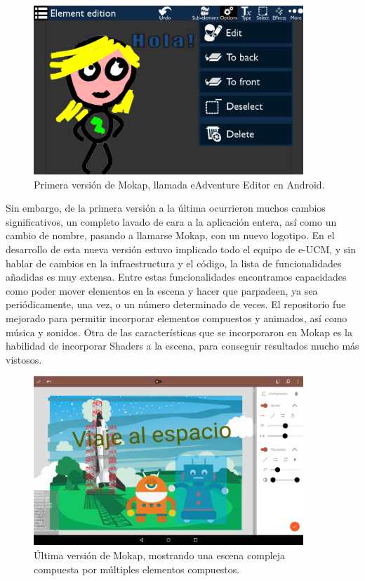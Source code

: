 \begin{figure}[htb]
	\includegraphics[height=2.5in]{figures/mokap1.png}
	\caption[Mokap - eAdventure Editor]{Primera versión de Mokap, llamada eAdventure Editor en Android.}
	\label{mokap1}
\end{figure}

Sin embargo, de la primera versión a la última ocurrieron muchos cambios significativos, un completo lavado de cara a la aplicación entera, así como un cambio de nombre, pasando a llamarse Mokap, con un nuevo logotipo. En el desarrollo de esta nueva versión estuvo implicado todo el equipo de e-UCM, y sin hablar de cambios en la infraestructura y el código, la lista de funcionalidades añadidas es muy extensa. Entre estas funcionalidades encontramos capacidades como poder mover elementos en la escena y hacer que parpadeen, ya sea periódicamente, una vez, o un número determinado de veces. El repositorio fue mejorado para permitir incorporar elementos compuestos y animados, así como música y sonidos. Otra de las características que se incorporaron en Mokap es la habilidad de incorporar Shaders a la escena, para conseguir resultados mucho más vistosos.

\begin{figure}[htb]
	\includegraphics[height=2.5in]{figures/mokap2.png}
	\caption[Mokap - Última Versión]{Última versión de Mokap, mostrando una escena compleja compuesta por múltiples elementos compuestos.}
	\label{mokap2}
\end{figure}

